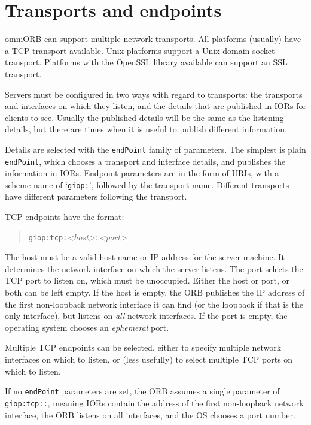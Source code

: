 \documentclass[11pt,oneside,a4paper]{book}
\newcommand{\code}[1]{\texttt{#1}}
\newcommand{\term}[1]{\textit{#1}}
\begin{document}
\section{Transports and endpoints}
\label{sec:endpoints}

omniORB can support multiple network transports. All platforms
(usually) have a TCP transport available. Unix platforms support a
Unix domain socket transport. Platforms with the OpenSSL library
available can support an SSL transport.

Servers must be configured in two ways with regard to transports: the
transports and interfaces on which they listen, and the details that
are published in IORs for clients to see. Usually the published
details will be the same as the listening details, but there are times
when it is useful to publish different information.

Details are selected with the \code{endPoint} family of parameters.
The simplest is plain \code{endPoint}, which chooses a transport and
interface details, and publishes the information in IORs. Endpoint
parameters are in the form of URIs, with a scheme name of
`\code{giop:}', followed by the transport name. Different transports
have different parameters following the transport.

TCP endpoints have the format:

\begin{quote}
\code{giop:tcp:}\textit{<host>}\code{:}\textit{<port>}
\end{quote}

\noindent The host must be a valid host name or IP address for the
server machine.  It determines the network interface on which the
server listens. The port selects the TCP port to listen on, which must
be unoccupied.  Either the host or port, or both can be left empty. If
the host is empty, the ORB publishes the IP address of the first
non-loopback network interface it can find (or the loopback if that is
the only interface), but listens on \emph{all} network interfaces. If
the port is empty, the operating system chooses an \term{ephemeral}
port.

Multiple TCP endpoints can be selected, either to specify multiple
network interfaces on which to listen, or (less usefully) to select
multiple TCP ports on which to listen.

If no \code{endPoint} parameters are set, the ORB assumes a single
parameter of \code{giop:tcp::}, meaning IORs contain the address of
the first non-loopback network interface, the ORB listens on all
interfaces, and the OS chooses a port number.
\end{document}
